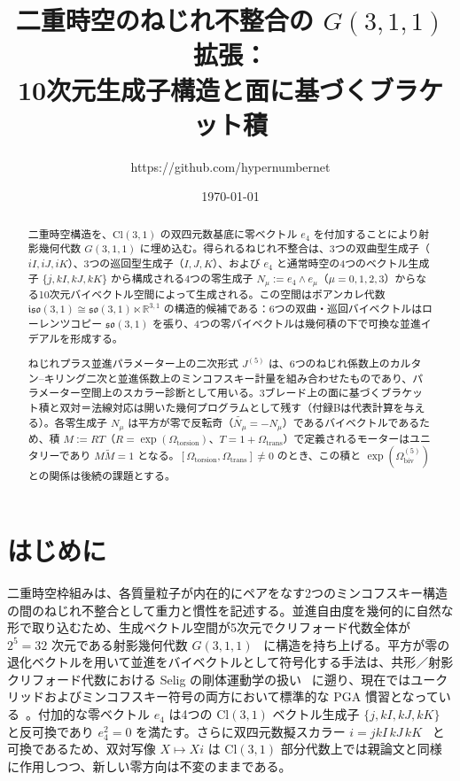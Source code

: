 \documentclass[dvipdfmx,11pt,a4paper]{article}
\title{二重時空のねじれ不整合の $G(3,1,1)$ 拡張：\\
10次元生成子構造と面に基づくブラケット積}
\author{https://github.com/hypernumbernet}
\date{\today}
\theoremstyle{definition}
\theoremstyle{plain}
\theoremstyle{remark}
\begin{document}
\maketitle

\begin{abstract}
二重時空構造を、$\mathrm{Cl}(3,1)$ の双四元数基底に零ベクトル $e_{4}$ を付加することにより射影幾何代数 $G(3,1,1)$ に埋め込む。得られるねじれ不整合は、3つの双曲型生成子（$iI, iJ, iK$）、3つの巡回型生成子（$I, J, K$）、および $e_{4}$ と通常時空の4つのベクトル生成子 $\{j, kI, kJ, kK\}$ から構成される4つの零生成子 $N_{\mu} := e_{4}\wedge e_{\mu}$（$\mu=0,1,2,3$）からなる10次元バイベクトル空間によって生成される。この空間はポアンカレ代数 $\mathfrak{iso}(3,1)\cong\mathfrak{so}(3,1)\ltimes\mathbb{R}^{3,1}$ の構造的候補である：6つの双曲・巡回バイベクトルはローレンツコピー $\mathfrak{so}(3,1)$ を張り、4つの零バイベクトルは幾何積の下で可換な並進イデアルを形成する。

ねじれプラス並進パラメーター上の二次形式 $J^{(5)}$ は、6つのねじれ係数上のカルタン--キリング二次と並進係数上のミンコフスキー計量を組み合わせたものであり、パラメーター空間上のスカラー診断として用いる。3ブレード上の面に基づくブラケット積と双対＝法線対応は開いた幾何プログラムとして残す（付録Bは代表計算を与える）。各零生成子 $N_{\mu}$ は平方が零で反転奇（$\widetilde{N_{\mu}}=-N_{\mu}$）であるバイベクトルであるため、積 $M:=RT$（$R=\exp(\Omega_{\mathrm{torsion}})$、$T=1+\Omega_{\mathrm{trans}}$）で定義されるモーターはユニタリーであり $M\widetilde{M}=1$ となる。$[\Omega_{\mathrm{torsion}},\Omega_{\mathrm{trans}}]\neq 0$ のとき、この積と $\exp(\Omega_{\mathrm{biv}}^{(5)})$ との関係は後続の課題とする。
\end{abstract}
 
\section{はじめに}
\label{sec:introduction}

二重時空枠組みは、各質量粒子が内在的にペアをなす2つのミンコフスキー構造の間のねじれ不整合として重力と慣性を記述する。並進自由度を幾何的に自然な形で取り込むため、生成ベクトル空間が5次元でクリフォード代数全体が $2^{5}=32$ 次元である射影幾何代数 $G(3,1,1)$~\cite{Gunn2017,Lengyel2024,DeKeninckDorst2019,GunnDeKeninck2020} に構造を持ち上げる。平方が零の退化ベクトルを用いて並進をバイベクトルとして符号化する手法は、共形／射影クリフォード代数における Selig の剛体運動学の扱い~\cite{Selig2005} に遡り、現在ではユークリッドおよびミンコフスキー符号の両方において標準的な PGA 慣習となっている~\cite{Lengyel2024,GunnDeKeninck2020}。付加的な零ベクトル $e_{4}$ は4つの $\mathrm{Cl}(3,1)$ ベクトル生成子 $\{j, kI, kJ, kK\}$~\cite{Hestenes2015,DoranLasenby2003} と反可換であり $e_{4}^{2}=0$ を満たす。さらに双四元数擬スカラー $i=jkI\,kJ\,kK$~\cite{ConwaySmith2003} と可換であるため、双対写像 $X\mapsto Xi$ は $\mathrm{Cl}(3,1)$ 部分代数上では親論文と同様に作用しつつ、新しい零方向は不変のままである。
\end{document}
